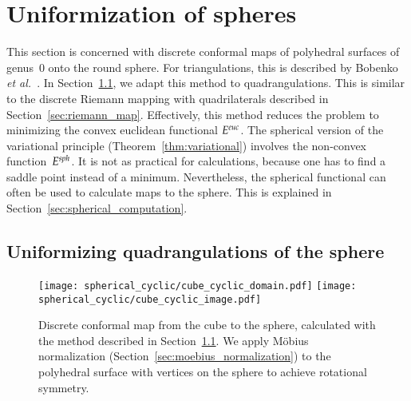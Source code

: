 \documentclass[Thesis]{subfiles}
\begin{document}
\section{Uniformization of spheres}
\label{sec:spheres}

This section is concerned with discrete conformal maps of polyhedral
surfaces of genus~$0$ onto the round sphere. For triangulations, this
is described by Bobenko {\it et al.}\ \cite[Section 3.2]{BPS2015:dconf}. In
Section~\ref{sec:spheres_euclidean}, we adapt this method to
quadrangulations. This is similar to the discrete Riemann mapping with
quadrilaterals described in
Section~\ref{sec:riemann_map}. Effectively, this method reduces the
problem to minimizing the convex euclidean functional $E^{\euc}$. The
spherical version of the variational principle
(Theorem~\ref{thm:variational}) involves the non-convex
function~$E^{\mathit{sph}}$. It is not as practical for calculations, because
one has to find a saddle point instead of a minimum. Nevertheless, the
spherical functional can often be used to calculate maps to the
sphere. This is explained in Section~\ref{sec:spherical_computation}.

\subsection{Uniformizing quadrangulations of the sphere}
\label{sec:spheres_euclidean}

\begin{figure}
\centering%
\texttt{[image: spherical\_cyclic/cube\_cyclic\_domain.pdf]}%
\hspace{0.1\textwidth}%
\texttt{[image: spherical\_cyclic/cube\_cyclic\_image.pdf]}\\
\caption{Discrete conformal map from the cube to the sphere,
  calculated with the method described in
  Section~\ref{sec:spheres_euclidean}. We apply M{\"o}bius
  normalization (Section~\ref{sec:moebius_normalization}) to the
  polyhedral surface with vertices on the sphere to achieve rotational
  symmetry.}
\label{fig:spherical_circular}
\end{figure}
\end{document}
